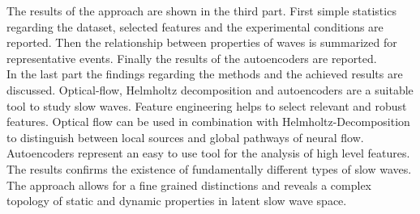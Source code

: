 The results of the approach are shown in the third part. First simple statistics regarding the dataset, selected features and the experimental conditions are reported. Then the relationship between properties of waves is summarized for representative events. Finally the results of the autoencoders are reported. \\
In the last part the findings regarding the methods and the achieved results are discussed. Optical-flow, Helmholtz decomposition and autoencoders are a suitable tool to study slow waves. Feature engineering helps to select relevant and robust features. Optical flow can be used in combination with Helmholtz-Decomposition to distinguish between local sources and global pathways of neural flow. Autoencoders represent an easy to use tool for the analysis of high level features. The results confirms the existence of fundamentally different types of slow waves. The approach allows for a fine grained distinctions and reveals a complex topology of static and dynamic properties in latent slow wave space.\\
